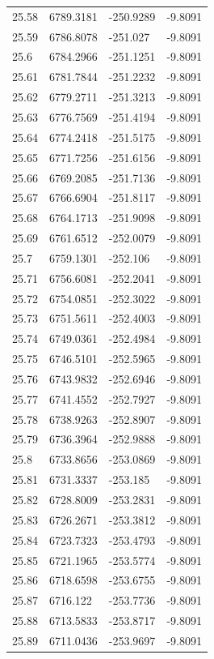 \begin{table}[H]
\begin{tabular}{llll}
25.58 & 6789.3181 & -250.9289 & -9.8091 \\
25.59 & 6786.8078 & -251.027 & -9.8091 \\
25.6 & 6784.2966 & -251.1251 & -9.8091 \\
25.61 & 6781.7844 & -251.2232 & -9.8091 \\
25.62 & 6779.2711 & -251.3213 & -9.8091 \\
25.63 & 6776.7569 & -251.4194 & -9.8091 \\
25.64 & 6774.2418 & -251.5175 & -9.8091 \\
25.65 & 6771.7256 & -251.6156 & -9.8091 \\
25.66 & 6769.2085 & -251.7136 & -9.8091 \\
25.67 & 6766.6904 & -251.8117 & -9.8091 \\
25.68 & 6764.1713 & -251.9098 & -9.8091 \\
25.69 & 6761.6512 & -252.0079 & -9.8091 \\
25.7 & 6759.1301 & -252.106 & -9.8091 \\
25.71 & 6756.6081 & -252.2041 & -9.8091 \\
25.72 & 6754.0851 & -252.3022 & -9.8091 \\
25.73 & 6751.5611 & -252.4003 & -9.8091 \\
25.74 & 6749.0361 & -252.4984 & -9.8091 \\
25.75 & 6746.5101 & -252.5965 & -9.8091 \\
25.76 & 6743.9832 & -252.6946 & -9.8091 \\
25.77 & 6741.4552 & -252.7927 & -9.8091 \\
25.78 & 6738.9263 & -252.8907 & -9.8091 \\
25.79 & 6736.3964 & -252.9888 & -9.8091 \\
25.8 & 6733.8656 & -253.0869 & -9.8091 \\
25.81 & 6731.3337 & -253.185 & -9.8091 \\
25.82 & 6728.8009 & -253.2831 & -9.8091 \\
25.83 & 6726.2671 & -253.3812 & -9.8091 \\
25.84 & 6723.7323 & -253.4793 & -9.8091 \\
25.85 & 6721.1965 & -253.5774 & -9.8091 \\
25.86 & 6718.6598 & -253.6755 & -9.8091 \\
25.87 & 6716.122 & -253.7736 & -9.8091 \\
25.88 & 6713.5833 & -253.8717 & -9.8091 \\
25.89 & 6711.0436 & -253.9697 & -9.8091 \\

\end{tabular}
\end{table}
